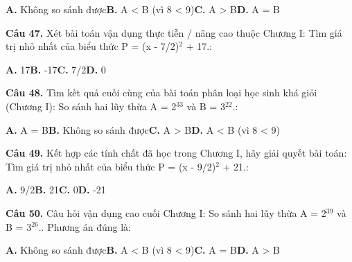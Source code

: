 \documentclass[11pt,a4paper]{article}
\begin{document}
\hspace*{1.5em}\textbf{A.} Không so sánh được\quad\quad \textbf{B.} A < B (vì 8 < 9)\quad\quad \textbf{C.} A > B\quad\quad \textbf{D.} A = B\par\vspace{2pt}
\textbf{\color{primary} Câu 47.} Xét bài toán vận dụng thực tiễn / nâng cao thuộc Chương I: Tìm giá trị nhỏ nhất của biểu thức P = (x - 7/2)$^2$ + 17.:\par
\hspace*{1.5em}\textbf{A.} 17\quad\quad \textbf{B.} -17\quad\quad \textbf{C.} 7/2\quad\quad \textbf{D.} 0\par\vspace{2pt}
\textbf{\color{primary} Câu 48.} Tìm kết quả cuối cùng của bài toán phân loại học sinh khá giỏi (Chương I): So sánh hai lũy thừa A = 2$^{33}$ và B = 3$^{22}$.:\par
\hspace*{1.5em}\textbf{A.} A = B\quad\quad \textbf{B.} Không so sánh được\quad\quad \textbf{C.} A > B\quad\quad \textbf{D.} A < B (vì 8 < 9)\par\vspace{2pt}
\textbf{\color{primary} Câu 49.} Kết hợp các tính chất đã học trong Chương I, hãy giải quyết bài toán: Tìm giá trị nhỏ nhất của biểu thức P = (x - 9/2)$^2$ + 21.:\par
\hspace*{1.5em}\textbf{A.} 9/2\quad\quad \textbf{B.} 21\quad\quad \textbf{C.} 0\quad\quad \textbf{D.} -21\par\vspace{2pt}
\textbf{\color{primary} Câu 50.} Câu hỏi vận dụng cao cuối Chương I: So sánh hai lũy thừa A = 2$^{39}$ và B = 3$^{26}$.. Phương án đúng là:\par
\hspace*{1.5em}\textbf{A.} Không so sánh được\quad\quad \textbf{B.} A < B (vì 8 < 9)\quad\quad \textbf{C.} A = B\quad\quad \textbf{D.} A > B\par\vspace{2pt}
\end{document}
